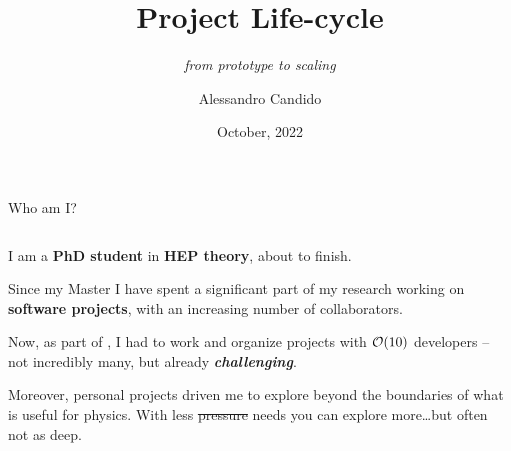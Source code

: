 \documentclass[9pt]{beamer}
\title{Project Life-cycle}
\subtitle{
    \itshape
    from prototype to scaling
}
\date{October, 2022}
\author{Alessandro Candido}
\begin{document}
\maketitle



\begin{frame}{Who am I?}
    \begin{columns}
        \begin{column}{0.5\textwidth}
            I am a \textbf{PhD student} in \textbf{HEP theory}, about to
            finish.\newline

            Since my Master I have spent a significant part of my research
            working on \alert{\textbf{software projects}}, with an increasing
            number of collaborators.\newline

            \newline

            Now, as part of \nnpdf{}, I had to work and organize projects with
            $\order{10}$ developers -- not incredibly many, but already
            \textit{\textbf{challenging}}.\newline

            Moreover, personal projects driven me to explore beyond the
            boundaries of what is useful for physics.
            With less \sout{pressure} needs you can explore more\dots but often
            not as deep.\newline

            \newline


\end{column}
\end{columns}
\end{frame}
\end{document}
